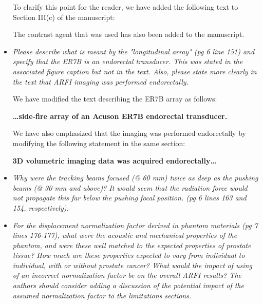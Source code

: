 \documentclass[10pt]{article}
\begin{document}
\begin{itemize}
    To clarify this point for the reader, we have added the following text to
    Section III(c) of the manuscript:

    \textbf{}

    The contrast agent that was used has also been added to the manuscript.

    \item \textit{Please describe what is meant by the "longitudinal array" (pg
            6 line 151) and specify that the ER7B is an endorectal transducer.
            This was stated in the associated figure caption but not in the
            text.  Also, please state more clearly in the text that ARFI
            imaging was performed endorectally.}

    We have modified the text describing the ER7B array as follows:

    \textbf{\ldots side-fire array of an Acuson ER7B endorectal transducer.}

    We have also emphasized that the imaging was performed endorectally by
    modifying the following statement in the same section:

    \textbf{3D volumetric imaging data was acquired endorectally\ldots}

    \item \textit{Why were the tracking beams focused (@ 60 mm) twice as deep
            as the pushing beams (@ 30 mm and above)?  It would seem that the
            radiation force would not propagate this far below the pushing
            focal position. (pg 6 lines 163 and 154, respectively).}

    \item \textit{For the displacement normalization factor derived in phantom
            materials (pg 7 lines 176-177), what were the acoustic and
            mechanical properties of the phantom, and were these well matched
            to the expected properties of prostate tissue?  How much are these
            properties expected to vary from individual to individual, with or
            without prostate cancer?  What would the impact of using of an
            incorrect normalization factor be on the overall ARFI results?  The
            authors should consider adding a discussion of the potential impact
            of the assumed normalization factor to the limitations sections.}


\end{itemize}
\end{document}
